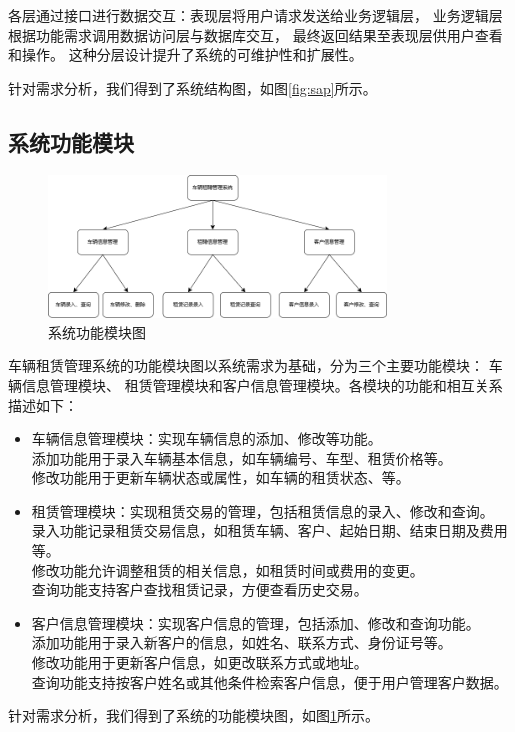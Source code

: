 \documentclass[UTF8,a4paper,12pt]{ctexart}
\begin{document}
各层通过接口进行数据交互：表现层将用户请求发送给业务逻辑层，
业务逻辑层根据功能需求调用数据访问层与数据库交互，
最终返回结果至表现层供用户查看和操作。
这种分层设计提升了系统的可维护性和扩展性。

针对需求分析，我们得到了系统结构图，如图\ref{fig:sap}所示。

\subsection{系统功能模块}

\begin{figure}[htbp]  %
    \centering  %
    \includegraphics[width=0.8\textwidth]{pic/system_function_modules.png}  %
    \caption{系统功能模块图}  %
    \label{fig:sfm}  %
\end{figure}

车辆租赁管理系统的功能模块图以系统需求为基础，分为三个主要功能模块：
车辆信息管理模块、
租赁管理模块和客户信息管理模块。各模块的功能和相互关系描述如下：

\begin{itemize}
    \item 车辆信息管理模块：实现车辆信息的添加、修改等功能。\\
    添加功能用于录入车辆基本信息，如车辆编号、车型、租赁价格等。\\
    修改功能用于更新车辆状态或属性，如车辆的租赁状态、等。
    \item 租赁管理模块：实现租赁交易的管理，包括租赁信息的录入、修改和查询。\\
    录入功能记录租赁交易信息，如租赁车辆、客户、起始日期、结束日期及费用等。\\
    修改功能允许调整租赁的相关信息，如租赁时间或费用的变更。\\
    查询功能支持客户查找租赁记录，方便查看历史交易。
    \item 客户信息管理模块：实现客户信息的管理，包括添加、修改和查询功能。\\
    添加功能用于录入新客户的信息，如姓名、联系方式、身份证号等。\\
    修改功能用于更新客户信息，如更改联系方式或地址。\\
    查询功能支持按客户姓名或其他条件检索客户信息，便于用户管理客户数据。\\
\end{itemize}
\vspace{-0.8cm}
针对需求分析，我们得到了系统的功能模块图，如图\ref{fig:sfm}所示。
\end{document}
